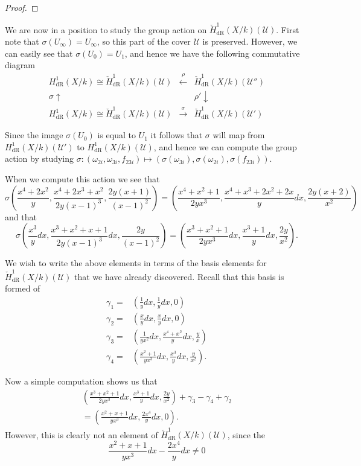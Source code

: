 \documentclass[draft, 11pt]{article} %
\theoremstyle{plain}
\theoremstyle{remark}
\newcommand{\cU}{{\mathcal U}}
\newcommand{\derhamhone}{H_{\text {dR}}^1(X/k)}
\newcommand{\cechderhamhone}{\check{H}_{\text {dR}}^1(X/k)}
\begin{document}
\begin{proof}
\end{proof}

We are now in a position to study the group action on $\cechderhamhone(\cU)$.
First note that $\sigma(U_\infty) = U_\infty$, so this part of the cover $\cU$ is preserved.
However, we can easily see that $\sigma(U_0) = U_1$, and hence we have the following commutative diagram
\[
\begin{array}{ccc}
\derhamhone \cong \cechderhamhone(\cU)  & \xleftarrow{\rho} & \cechderhamhone(\cU'')  \\
\sigma\uparrow & ~ & \rho'\downarrow  \\
\derhamhone \cong \cechderhamhone(\cU)  & \xrightarrow{\sigma} & \cechderhamhone(\cU')
\end{array}
\]

Since the image $\sigma (U_0)$ is equal to $U_1$ it follows that $\sigma$ will map from $\derhamhone(\cU')$ to $\derhamhone(\cU)$, and hence we can compute the group action by studying $\sigma \colon (\omega_{2i}, \omega_{3i}, f_{23i}) \mapsto (\sigma(\omega_{3i}), \sigma (\omega_{2i}), \sigma(f_{23i}))$.

When we compute this action we see that
\[
\sigma\left( \frac{x^4 + 2x^2}{y}, \frac{x^4+2x^3+x^2}{2y(x-1)^3} , \frac{2y(x+1)}{(x-1)^2} \right) = \left( \frac{x^4 + x^2 + 1}{2yx^3}, \frac{x^4 + x^3 + 2x^2 + 2x}{y}dx, \frac{2y(x+2)}{x^2} \right)
\]
and that
\[
\sigma\left( \frac{x^3}{y}dx, \frac{x^3 + x^2 + x + 1}{2y(x-1)^3}dx, \frac{2y}{(x-1)^2} \right) = \left( \frac{x^3 + x^2 + 1}{2yx^3}dx, \frac{x^3 + 1}{y}dx, \frac{2y}{x^2}\right).
\]

We wish to write the above elements in terms of the basis elements for $\cechderhamhone(\cU)$ that we have already discovered.
Recall that this basis is formed of
\begin{align}
\gamma_1  = & \left( \frac{1}{y}dx, \frac{1}{y}dx, 0\right) \\
\gamma_2 = & \left(\frac{x}{y}dx, \frac{x}{y}dx, 0\right) \\
\gamma_3 = & \left( \frac{1}{yx^2}dx, \frac{x^4 + x^2}{y}dx, \frac{y}{x} \right)\\
\gamma_4 = & \left(\frac{x^2+1}{yx^3}dx, \frac{x^3}{y}dx, \frac{y}{x^2} \right).
\end{align}

Now a simple computation shows us that
\begin{multline}
\left( \frac{x^3 + x^2 + 1}{2yx^3}dx, \frac{x^3 + 1}{y}dx, \frac{2y}{x^2}\right) + \gamma_3 - \gamma_4 + \gamma_2 \\
= \left( \frac{x^2 + x + 1}{yx^3}dx, \frac{2x^4}{y}dx, 0 \right).
\end{multline}
However, this is clearly not an element of $\cechderhamhone(\cU)$, since the 
\[
\frac{x^2+x+1}{yx^3}dx - \frac{2x^4}{y}dx \neq 0
\]




\end{document}
